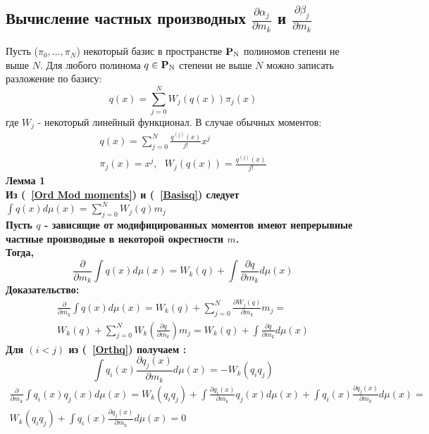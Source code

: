 \subsection{ Вычисление частных производных $\frac{\partial \alpha_j}{\partial m_k}$ и $\frac{\partial \beta_j}{\partial m_k}$ }
Пусть ($\pi_0,\ldots,\pi_N$) некоторый базис в пространстве $\bf P \rm_N$ полиномов степени не выше $N$.
Для любого полинома $q\in \bf P \rm_N$ степени не выше $N$ можно записать разложение по базису:
\begin{equation}
\label{Basisq}
q(x)=\sum\limits_{j=0}^{N}{W_j(q(x))\pi_j(x)}
\end{equation}
где $W_j$ - некоторый линейный функционал.
В случае обычных моментов:
\begin{eqnarray}
q(x)=\sum\limits_{j=0}^{N} { \frac { q^{(j)}(x)} {j!}  x^j} \nonumber \\
\pi_j(x)=x^j, \mbox{   } W_j(q(x))=\frac { q^{(j)}(x)} {j!} \nonumber
\end{eqnarray}
\bf Лемма 1 \rm \\
Из (~\ref{Ord Mod moments}) и (~\ref{Basisq}) следует $\int{q(x)d\mu(x)}=\sum\limits_{j=0}^{N}{W_j(q)m_j}$ \\
Пусть $q$ - зависящие от модифицированных моментов имеют непрерывные частные производные в некоторой окрестности $m$. \\
Тогда,
\begin{equation}
\frac{\partial}{\partial m_k} \int q(x) d\mu(x)=W_k(q)+\int { \frac {\partial q} {\partial m_k}  d\mu(x)}
\end{equation}
\bf Доказательство: \rm
\begin{eqnarray}
\frac{\partial}{\partial m_k} \int q(x) d\mu(x)=
W_k(q)+\sum\limits_{j=0}^{N} { \frac {\partial W_j(q)} {\partial m_k} m_j}= \nonumber \\
W_k(q)+\sum\limits_{j=0}^{N} { W_k \left( \frac {\partial q} {\partial m_k} \right) m_j}=
W_k(q)+\int { \frac {\partial q} {\partial m_k}  d\mu(x)} \nonumber
\end{eqnarray}
Для $(i<j)$ из (~\ref{Orthq}) получаем :
\begin{equation}
\label{Orth1}
\int q_i(x)\frac{\partial q_j(x)}{\partial m_k}d\mu(x)=-W_k(q_iq_j)
\end{equation}
\begin{eqnarray}
\frac{\partial}{\partial m_k} \int q_i(x)q_j(x)d\mu(x)=
W_k(q_iq_j)+\int \frac{\partial q_i(x)}{\partial m_k}q_j(x)d\mu(x)+\int q_i(x)\frac{\partial q_j(x)}{\partial m_k}d\mu(x)= \nonumber \\
W_k(q_iq_j)+\int q_i(x)\frac{\partial q_j(x)}{\partial m_k}d\mu(x)=0 \nonumber
\end{eqnarray}
